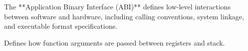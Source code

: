 \begin{NxSSBox}
	\begin{NxIDBox}
		The **Application Binary Interface (ABI)** defines low-level interactions between software and hardware, including calling conventions, system linkage, and executable format specifications.
	\end{NxIDBox}
	\begin{NxIDBoxL}
		 Defines how function arguments are passed between registers and stack.
	\end{NxIDBoxL}
\end{NxSSBox}


